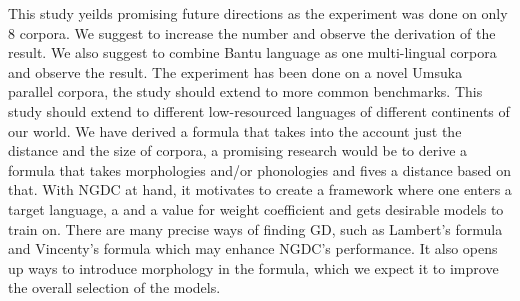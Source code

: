 \documentclass[11pt]{article}
\begin{document}
This study yeilds promising future directions as the experiment was done on only 8 corpora. We suggest to increase the number and observe the derivation of the result. We also suggest to combine Bantu language as one multi-lingual corpora and observe the result. The experiment has been done on a novel Umsuka parallel corpora, the study should extend to more common benchmarks. This study should extend to different low-resourced languages of different continents of our world. We have derived a formula that takes into the account just the distance and the size of corpora, a promising research would be to derive a formula that takes morphologies and/or phonologies and fives a distance based on that. With NGDC at hand, it motivates to create a framework where one enters a target language, a  and a value for weight coefficient  and gets desirable models to train on. There are many precise ways of finding GD, such as Lambert's formula \citep{lambert1942distance} and Vincenty's formula \citep{vincenty1975direct} which may enhance NGDC's performance. It also opens up ways to introduce morphology in the formula, which we expect it to improve the overall selection of the models.





\end{document}
